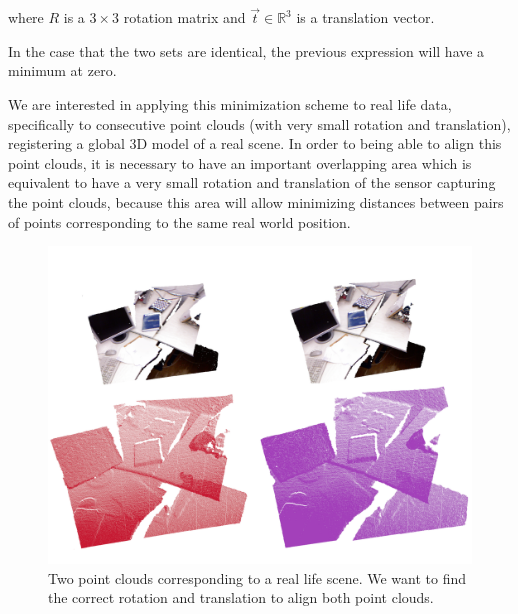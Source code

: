 \noindent where $R$ is a  $3\times3$ rotation matrix and $\vec{t} \in \mathbb{R}^3$ is a translation vector.


In the case that the two sets are identical, the previous expression will have a minimum at zero.

We are interested in applying this minimization scheme to real life data, specifically to consecutive 
point clouds (with very small rotation and translation), registering a global 3D model of 
a real scene. In order to being able to align this point clouds, it is necessary to have an important overlapping 
area which is equivalent to have a very small rotation and translation of the sensor capturing the point clouds, 
because this area will allow minimizing distances between pairs of points corresponding to the same real world position.


\begin{figure}[H]
\begin{center}
\includegraphics[scale=0.3]{images/two_clouds}
\caption{Two point clouds corresponding to a real life scene. We want to find the correct rotation and translation to align both point clouds.}
\end{center}
\end{figure}

